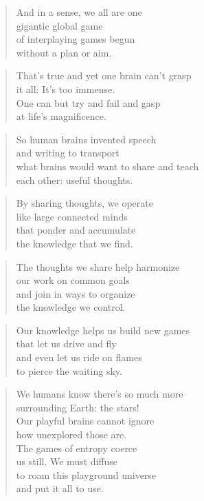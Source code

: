 \documentclass[14pt,a4paper]{article}
\begin{document}
\begin{verse}
And in a sense, we all are one\\
gigantic global game\\
of interplaying games begun\\
without a plan or aim.
\end{verse}

\begin{verse}
That’s true and yet one brain can’t grasp\\
it all: It’s too immense.\\
One can but try and fail and gasp\\
at life’s magnificence.
\end{verse}

\begin{verse}
So human brains invented speech\\
and writing to transport\\
what brains would want to share and teach\\
each other: useful thoughts.
\end{verse}

\begin{verse}
By sharing thoughts, we operate\\
like large connected minds\\
that ponder and accumulate\\
the knowledge that we find.
\end{verse}

\begin{verse}
The thoughts we share help harmonize\\
our work on common goals\\
and join in ways to organize\\
the knowledge we control.
\end{verse}

\begin{verse}
Our knowledge helps us build new games\\
that let us drive and fly\\
and even let us ride on flames\\
to pierce the waiting sky.
\end{verse}

\begin{verse}
We humans know there’s so much more\\
surrounding Earth: the stars!\\
Our playful brains cannot ignore\\
how unexplored those are.
\\
The games of entropy coerce\\
us still. We must diffuse\\
to roam this playground universe\\
and put it all to use.
\end{verse}
\end{document}
